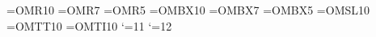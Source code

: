 \font\TENRM=OMR10
\font\SEVENRM=OMR7
\font\FIVERM=OMR5
\font\TENBF=OMBX10
\font\SEVENBF=OMBX7
\font\FIVEBF=OMBX5
\font\TENSL=OMSL10
\font\TENTT=OMTT10
\font\TENIT=OMTI10
\pdfpagewidth=210mm
\pdfpageheight=297mm
\pdfhorigin=15mm
\pdfvorigin=15mm
\hsize=180mm
\vsize=264.46mm
\catcode`\@=11
\def\m@g{\mag\count@
  \hsize180truemm
  \vsize264.46truemm
  \dimen\footins8truein
  \pdfpagewidth=210truemm
  \pdfpageheight=297truemm
  \pdfhorigin=15truemm
  \pdfvorigin=15truemm}
\catcode`\@=12
